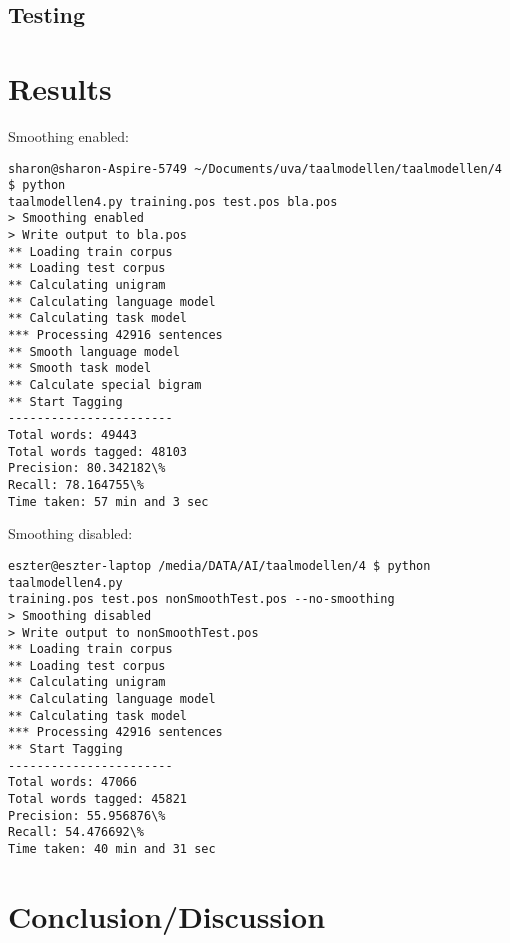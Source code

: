 \documentclass[10pt, a4paper]{article}
\begin{document}
\subsection*{Testing}



\section*{Results}
Smoothing enabled:
\begin{verbatim}
sharon@sharon-Aspire-5749 ~/Documents/uva/taalmodellen/taalmodellen/4 $ python 
taalmodellen4.py training.pos test.pos bla.pos
> Smoothing enabled
> Write output to bla.pos
** Loading train corpus
** Loading test corpus
** Calculating unigram
** Calculating language model
** Calculating task model
*** Processing 42916 sentences
** Smooth language model
** Smooth task model
** Calculate special bigram
** Start Tagging
-----------------------
Total words: 49443
Total words tagged: 48103
Precision: 80.342182\%
Recall: 78.164755\%
Time taken: 57 min and 3 sec
\end{verbatim}
Smoothing disabled:
\begin{verbatim}
eszter@eszter-laptop /media/DATA/AI/taalmodellen/4 $ python taalmodellen4.py 
training.pos test.pos nonSmoothTest.pos --no-smoothing
> Smoothing disabled
> Write output to nonSmoothTest.pos
** Loading train corpus
** Loading test corpus
** Calculating unigram
** Calculating language model
** Calculating task model
*** Processing 42916 sentences
** Start Tagging
-----------------------
Total words: 47066
Total words tagged: 45821
Precision: 55.956876\%
Recall: 54.476692\%
Time taken: 40 min and 31 sec
\end{verbatim}

\section*{Conclusion/Discussion}
\end{document}
